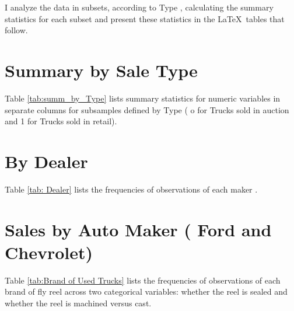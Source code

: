 \documentclass[11pt]{article}
\begin{document}
\medskip
\noindent
I analyze the data in subsets, according to Type , 
calculating the summary statistics for each subset and present these 
statistics in the \LaTeX\ tables that follow.

\vfill


\pagebreak
\section{Summary by Sale Type}

Table \ref{tab:summ_by_Type} lists summary statistics for numeric variables
in separate columns for subsamples defined by Type ( o for Trucks sold in auction and 1 for Trucks sold in retail). 





\section{By Dealer}

Table \ref{tab: Dealer} lists the frequencies of observations of 
each maker . 



\pagebreak
\section{Sales by Auto Maker ( Ford and Chevrolet)}

Table \ref{tab:Brand of Used Trucks} lists the frequencies of observations of 
each brand of fly reel across two categorical variables:
whether the reel is sealed
and whether the reel is machined versus cast. 





\end{document}
